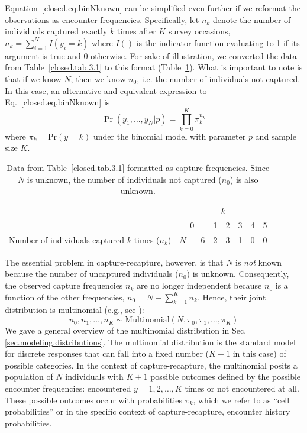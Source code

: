Equation~\ref{closed.eq.binNknown} can be simplified even further if
we reformat the 
observations as encounter
 frequencies.
Specifically, let $n_k$ denote the number
of individuals captured exactly $k$ times after $K$ survey occasions, $n_k = \sum_{i=1}^N
I(y_i = k)$ where $I()$ is the indicator function evaluating to 1 if its
argument is true and 0 otherwise. For sake of illustration,
we converted the data from Table~\ref{closed.tab.3.1} to this
format (Table~\ref{closed.tab.3.1.nk}). What is important to note is
that if we know $N$, then we know $n_0$, i.e. the number of
individuals not captured. In this case, an alternative and equivalent expression to
Eq.~\ref{closed.eq.binNknown} is
\begin{equation}
  \Pr(y_1, \ldots, y_N | p) = \prod_{k=0}^K  \pi_{k}^{n_k}
  \label{closed.eq.multiNknown}
\end{equation}
where $\pi_{k} = \mathrm{Pr}(y=k)$ under the binomial model with
parameter $p$ and sample size $K$.
\begin{table}[ht]
\centering
\caption{Data from Table~\ref{closed.tab.3.1} formatted as capture
  frequencies. Since $N$ is unknown, the number of individuals not
  captured ($n_0$) is also unknown.}
\begin{tabular}{lcccccc}
\hline
& \multicolumn{6}{c}{$k$} \\
\cline{2-7}
 & 0  & 1 & 2 & 3 & 4 & 5 \\
\hline
Number of individuals captured $k$ times ($n_k$) & $N\; - \; 6$ & 2 & 3 & 1 & 0 & 0 \\
\hline
\end{tabular}
\label{closed.tab.3.1.nk}
\end{table}
The essential problem in capture-recapture, however, is that $N$ is
{\it not} known because the number of uncaptured
individuals ($n_0$)
is unknown. 
Consequently, the observed capture frequencies $n_k$ are no
longer independent because $n_0$ is a function of the other
frequencies, $n_0 = N-\sum_{k=1}^K n_k$. Hence, their joint distribution is multinomial
(e.g., see \citet[][p. 61]{illian_etal:2008}):
\begin{equation}
    n_0, n_1, \ldots, n_K \sim \mathrm{Multinomial}(N, \pi_0, \pi_1, \ldots, \pi_K)
\label{closed.eq.multinomial4m0}
\end{equation}
We gave a general overview of the multinomial distribution in
Sec. \ref{sec.modeling.distributions}. The multinomial distribution is
the standard model for discrete responses that can fall into a fixed
number ($K+1$ in this case) of possible categories. In the context of
capture-recapture, the multinomial posits a population of $N$
individuals with $K+1$ possible outcomes defined by the possible
encounter frequencies: encountered $y=1,2,\ldots,K$ times or not encountered
at all. These possible outcomes occur with
probabilities $\pi_{k}$, which we refer to as ``cell probabilities''
or in the specific context of capture-recapture, encounter history
probabilities.


